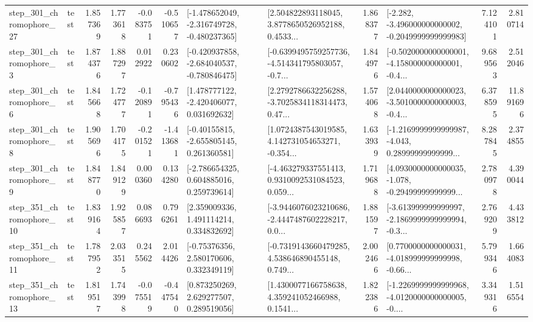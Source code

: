 \begin{tabular}{llrrrrllrlrr}
  step\_301\_chromophore\_27 &      test &      1.857369 &    1.773618 &     -0.083751 & -0.510657 &  [-1.478652049, -2.316749728, -0.480237365] &  [2.504822893118045, 3.8778650526952188, 0.4533... &       1.868377 &  [-2.282, -3.496000000000002, -0.2049999999999983] &            7.124101 &          2.810714 \\
   step\_301\_chromophore\_3 &      test &      1.874376 &    1.887297 &      0.012922 &  0.230602 &  [-0.420937858, -2.684040537, -0.780846475] &  [-0.6399495759257736, -4.514341795803057, -0.7... &       1.844976 &  [-0.5020000000000001, -4.158000000000001, -0.4... &            9.689563 &          2.512046 \\
   step\_301\_chromophore\_6 &      test &      1.845668 &    1.724777 &     -0.120891 & -0.795436 &    [1.478777122, -2.420406077, 0.031692632] &  [2.2792786632256288, -3.7025834118314473, 0.47... &       1.574068 &  [2.0440000000000023, -3.5010000000000003, -0.4... &            6.378595 &         11.891696 \\
   step\_301\_chromophore\_8 &      test &      1.905696 &    1.704175 &     -0.201521 & -1.413681 &    [-0.40155815, -2.655805145, 0.261360581] &  [1.0724387543019585, 4.142731054653271, -0.354... &       1.633939 &  [-1.2169999999999987, -4.043, 0.28999999999999... &            8.287845 &          2.374855 \\
   step\_301\_chromophore\_9 &      test &      1.848770 &    1.849129 &      0.000360 &  0.134280 &    [-2.786654325, 0.604885016, 0.259739614] &  [-4.463279337551413, 0.9310092531084523, 0.059... &       1.719688 &  [4.0930000000000035, -1.078, -0.29499999999999... &            2.780978 &          4.390044 \\
  step\_351\_chromophore\_10 &      test &      1.839164 &    1.925857 &      0.086693 &  0.796261 &     [2.359009336, 1.491114214, 0.334832692] &  [-3.9446076023210686, -2.4447487602228217, 0.0... &       1.881597 &  [-3.613999999999997, -2.1869999999999994, -0.3... &            2.769209 &          4.433812 \\
  step\_351\_chromophore\_11 &      test &      1.787952 &    2.033515 &      0.245562 &  2.014426 &     [-0.75376356, 2.580170606, 0.332349119] &  [-0.7319143660479285, 4.538646890455148, 0.749... &       2.002466 &  [0.7700000000000031, -4.018999999999998, -0.66... &            5.799346 &          1.664083 \\
  step\_351\_chromophore\_13 &      test &      1.819517 &    1.743998 &     -0.075519 & -0.447540 &     [0.873250269, 2.629277507, 0.289519056] &  [1.4300077166758638, 4.359241052466988, 0.1541... &       1.822386 &  [-1.2269999999999968, -4.0120000000000005, -0.... &            3.349316 &          1.516554 \\

\end{tabular}
